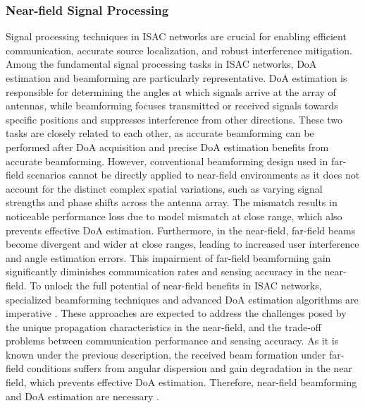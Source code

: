 \documentclass[10pt,journal,twocolumn,twoside]{IEEEtran} %
\begin{document}
\subsubsection{\textbf{Near-field Signal Processing} }
Signal processing techniques in ISAC networks are crucial for enabling efficient communication, accurate source localization, and robust interference mitigation. Among the fundamental signal processing tasks in ISAC networks, DoA estimation and beamforming are particularly representative. DoA estimation is responsible for determining the angles at which signals arrive at the array of antennas, while beamforming focuses transmitted or received signals towards specific positions and suppresses interference from other directions. These two tasks are closely related to each other, as accurate beamforming can be performed after DoA acquisition and precise DoA estimation benefits from accurate beamforming. 
 However, conventional beamforming design used in far-field scenarios cannot be directly applied to near-field environments as it does not account for the distinct complex spatial variations, such as varying signal strengths and phase shifts across the antenna array. The mismatch results in noticeable performance loss due to model mismatch at close range, which also prevents effective DoA estimation. Furthermore, in the near-field, far-field beams become divergent and wider at close ranges, leading to increased user interference and angle estimation errors. This impairment of far-field beamforming gain significantly diminishes communication rates and sensing accuracy in the near-field. To unlock the full potential of near-field benefits in ISAC networks, specialized beamforming techniques and advanced DoA estimation algorithms are imperative \cite{9723331,8359308}. These approaches are expected to address the challenges posed by the unique propagation characteristics in the near-field, and the trade-off problems between communication performance and sensing accuracy.
As it is known under the previous description, the received beam formation under far-field conditions suffers from angular dispersion and gain degradation in the near field, which prevents effective DoA estimation. Therefore, near-field beamforming and DoA estimation are necessary \cite{9723331,8359308}. 
\end{document}
